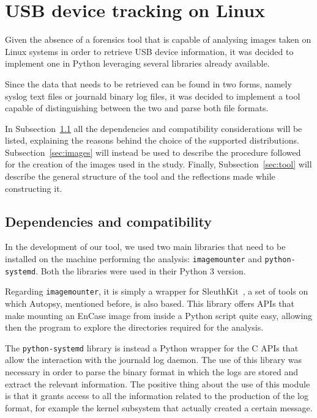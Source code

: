 \documentclass[a4paper,twocolumn]{article}
\begin{document}
\section{USB device tracking on Linux}
\label{sec:contrib}
Given the absence of a forensics tool that is capable of analysing images taken
on Linux systems in order to retrieve USB device information, it was decided to
implement one in Python leveraging several libraries already available.

Since the data that needs to be retrieved can be found in two forms, namely
syslog text files or journald binary log files, it was decided to implement a
tool capable of distinguishing between the two and parse both file formats.

In Subsection~\ref{sec:prems} all the dependencies and compatibility
considerations will be listed, explaining the reasons behind the choice of the
supported distributions. Subsection~\ref{sec:images} will instead be used to
describe the procedure followed for the creation of the images used in the
study. Finally, Subsection~\ref{sec:tool} will describe the general structure of
the tool and the reflections made while constructing it.

\subsection{Dependencies and compatibility}
\label{sec:prems}
In the development of our tool, we used two main libraries that need
to be installed on the machine performing the analysis:
\texttt{imagemounter} and \texttt{python-systemd}. Both the libraries were used
in their Python 3 version.

Regarding \texttt{imagemounter}, it is simply a wrapper for
SleuthKit~\cite{sleuthkit}, a set of tools on which Autopsy, mentioned before,
is also based.  This library offers APIs that make mounting an EnCase image from
inside a Python script quite easy, allowing then the program to explore the
directories required for the analysis.

The \texttt{python-systemd} library is instead a Python wrapper for the C APIs
that allow the interaction with the journald log daemon. The use of this library
was necessary in order to parse the binary format in which the logs are stored
and extract the relevant information. The positive thing about the use of this
module is that it grants access to all the information related to the production
of the log format, for example the kernel subsystem that actually created a
certain message.
\end{document}

